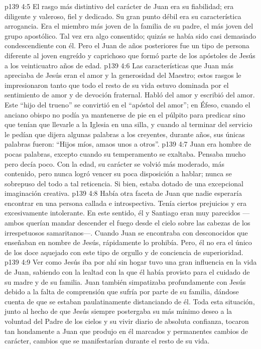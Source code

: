\vs p139 4:5 El rasgo más distintivo del carácter de Juan era su fiabilidad; era diligente y valeroso, fiel y dedicado. Su gran punto débil era su característica arrogancia. Era el miembro más joven de la familia de su padre, el más joven del grupo apostólico. Tal vez era algo consentido; quizás se había sido casi demasiado condescendiente con él. Pero el Juan de años posteriores fue un tipo de persona diferente al joven engreído y caprichoso que formó parte de los apóstoles de Jesús a los veinticuatro años de edad.
\vs p139 4:6 \pc Las características que Juan más apreciaba de Jesús eran el amor y la generosidad del Maestro; estos rasgos le impresionaron tanto que todo el resto de su vida estuvo dominada por el sentimiento de amor y de devoción fraternal. Habló del amor y escribió del amor. Este “hijo del trueno” se convirtió en el “apóstol del amor”; en Éfeso, cuando el anciano obispo no podía ya mantenerse de pie en el púlpito para predicar sino que tenían que llevarle a la Iglesia en una silla, y cuando al terminar del servicio le pedían que dijera algunas palabras a los creyentes, durante años, sus únicas palabras fueron: “Hijos míos, amaos unos a otros”.
\vs p139 4:7 \pc Juan era hombre de pocas palabras, excepto cuando su temperamento se exaltaba. Pensaba mucho pero decía poco. Con la edad, su carácter se volvió más moderado, más contenido, pero nunca logró vencer su poca disposición a hablar; nunca se sobrepuso del todo a tal reticencia. Si bien, estaba dotado de una excepcional imaginación creativa.
\vs p139 4:8 \pc Había otra faceta de Juan que nadie esperaría encontrar en una persona callada e introspectiva. Tenía ciertos prejuicios y era excesivamente intolerante. En este sentido, él y Santiago eran muy parecidos ---ambos querían mandar descender el fuego desde el cielo sobre las cabezas de los irrespetuosos samaritanos---. Cuando Juan se encontraba con desconocidos que enseñaban en nombre de Jesús, rápidamente lo prohibía. Pero, él no era el único de los doce aquejado con este tipo de orgullo y de conciencia de superioridad.
\vs p139 4:9 Ver como Jesús iba por ahí sin hogar tuvo una gran influencia en la vida de Juan, sabiendo con la lealtad con la que él había provisto para el cuidado de su madre y de su familia. Juan también simpatizaba profundamente con Jesús debido a la falta de comprensión que sufría por parte de su familia, dándose cuenta de que se estaban paulatinamente distanciando de él. Toda esta situación, junto al hecho de que Jesús siempre postergaba su más mínimo deseo a la voluntad del Padre de los cielos y su vivir diario de absoluta confianza, tocaron tan hondamente a Juan que produjo en él marcados y permanentes cambios de carácter, cambios que se manifestarían durante el resto de su vida.
